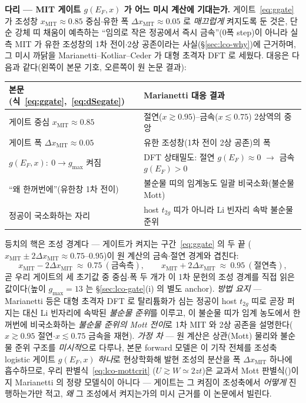 \begin{srcbox}
\textbf{다리 --- MIT 게이트 $g(E_F,x)$ 가 어느 미시 계산에 기대는가.} 게이트~\eqref{eq:ggate} 가 조성창
$x_\mathrm{MIT}\!\approx\!0.85$ 중심$\cdot$유한 폭 $\Delta x_\mathrm{MIT}\!\approx\!0.05$ 로 \emph{매끄럽게}
켜지도록 둔 것은, 단순 강체 띠 채움이 예측하는 ``임의로 작은 정공에서 즉시 금속''(0폭 step)이 아니라 실측
MIT 가 유한 조성창의 1차 전이$\cdot$2상 공존이라는 사실(\S\ref{sec:lco-why})에 근거하며, 그 미시 까닭을
Marianetti--Kotliar--Ceder\cite{marianetti2004} 가 대형 초격자 DFT 로 세웠다. 대응은 다음과 같다(왼쪽이
본문 기호, 오른쪽이 원 논문 결과):
\begin{center}\footnotesize
\begin{tabular}{@{}ll@{}}
\hline
본문(식~\eqref{eq:ggate},~\eqref{eq:dSegate}) & Marianetti\cite{marianetti2004} 대응 결과 \\
\hline
게이트 중심 $x_\mathrm{MIT}\!\approx\!0.85$ & 절연($x\gtrsim0.95$)--금속($x\lesssim0.75$) 2상역의 중앙 \\
게이트 폭 $\Delta x_\mathrm{MIT}\!\approx\!0.05$ & 유한 조성창(1차 전이 2상 공존)의 폭 \\
$g(E_F,x)\!:\ 0\!\to\!g_{\max}$ 켜짐 & DFT 상태밀도: 절연 $g(E_F){\approx}0$ $\to$ 금속 $g(E_F){>}0$ \\
``왜 한꺼번에''(유한창 1차 전이) & 불순물 띠의 임계농도 일괄 비국소화(불순물 Mott) \\
정공이 국소화하는 자리 & host $t_{2g}$ 띠가 아니라 Li 빈자리 속박 불순물 준위 \\
\hline
\end{tabular}
\end{center}
등치의 핵은 조성 경계다 --- 게이트가 켜지는 구간~\eqref{eq:ggate} 의 두 끝
($x_\mathrm{MIT}\!\pm\!2\Delta x_\mathrm{MIT}\!\approx\!0.75$--$0.95$)이 원 계산의 금속$\cdot$절연 경계와
겹친다:
\begin{equation}
x_\mathrm{MIT}-2\Delta x_\mathrm{MIT}\ \approx\ 0.75\ (\text{금속측}),\qquad
x_\mathrm{MIT}+2\Delta x_\mathrm{MIT}\ \approx\ 0.95\ (\text{절연측}),
\label{eq:br-marianetti2004-1}
\end{equation}
곧 우리 게이트의 세 초기값 중 중심$\cdot$폭 두 개가 이 1차 문헌의 조성 경계를 직접 읽은 값이다(높이
$g_{\max}\!=\!13$ 는 \S\ref{sec:lco-gate}(i) 의 별도 anchor\cite{motohashi2009}). \emph{방법 요지} ---
Marianetti 등은 대형 초격자 DFT 로 탈리튬화가 심는 정공이 host $t_{2g}$ 띠로 곧장 퍼지는 대신 Li
빈자리에 속박된 \emph{불순물 준위}를 이루고, 이 불순물 띠가 임계 농도에서 한꺼번에 비국소화하는
\emph{불순물 준위의 Mott 전이}로 1차 MIT 와 2상 공존을 설명한다($x\gtrsim0.95$ 절연$\cdot$$x\lesssim0.75$
금속을 재현). \emph{가정 차} --- 원 계산은 상관(Mott) 물리와 불순물 준위 구조를 \emph{미시적}으로 다루나,
본문 forward 모델은 이 기작 전체를 조성축 logistic 게이트 $g(E_F,x)$ \emph{하나}로 현상학화해 발현
조성의 분산을 폭 $\Delta x_\mathrm{MIT}$ 하나에 흡수하므로, 우리 판별식~\eqref{eq:lco-mottcrit}
($U\!\gtrsim\!W\!\simeq\!2zt$)은 교과서 Mott 판별식(\cite{mott1968,imada1998})이지 Marianetti 의 정량
모델식이 아니다 --- 게이트는 그 켜짐이 조성축에서 \emph{어떻게} 진행하는가만 적고, \emph{왜} 그
조성에서 켜지는가의 미시 근거를 이 논문에서 빌린다.
\end{srcbox}

